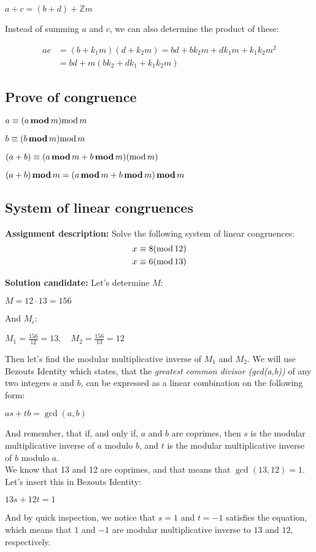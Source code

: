 \documentclass{report}
\newcommand{\cent}[1]{\begin{center}#1\end{center}}
\newcommand{\mAlign}[1]{\begin{align*}#1\end{align*}}
\newcommand{\doubleZ}{\mathbb{Z}}
\newcommand{\assignmentDescription}{\textbf{Assignment description: }}
\newcommand{\solution}{\textbf{Solution candidate: }}
\newcommand{\QED}{\boxed{}}
\newcommand{\modInline}{\text{mod\,}}
\newcommand{\modFunc}{\text{\,\textbf{mod}\,}}
\begin{document}
	\cent{$a+c=(b+d)+\doubleZ m$}
	
	Instead of summing $a$ and $c$, we can also determine the product of these:
	
	\mAlign{ac  &= (b + k_1m)(d + k_2m) = bd + b k_2m + d k_1 m + k_1 k_2 m^2\\
					   &= bd + m(bk_2 + dk_1 + k_1k_2m)}
	
	\QED
	
 	\subsection{Prove of congruence}
 	
 	\cent{$a \equiv (a \modFunc m) \modInline m$}
 	\cent{$b \equiv (b \modFunc m) \modInline m$}
 	\cent{$(a+b) \equiv (a \modFunc m + b \modFunc m) (\modInline m)$}
 	\cent{$(a+b) \modFunc m = (a \modFunc m + b \modFunc m) \modFunc m$}
 	\subsection{System of linear congruences}
 	\assignmentDescription
 	Solve the following system of linear congruences:
 	\mAlign{x &\equiv 8 (\modInline 12) \\
 				  x &\equiv 6 (\modInline 13)}
 	
 	\solution
 	Let's determine $M$:
 	
 	\cent{$M = 12 \cdot 13 = 156$}
 	
 	And $M_i$:
 	
 	\cent{$M_1 = \frac{156}{12} = 13, \quad M_2 = \frac{156}{13} = 12$}
 	
 	Then let's find the modular multiplicative inverse of $M_1$ and $M_2$. We will use Bezouts Identity which states, that the \textit{greatest common divisor (gcd(a,b))} of any two integers $a$ and $b$, can be expressed as a linear combination on the following form:
 	
 	\cent{$as+tb=\gcd(a,b)$}
 	
 	And remember, that if, and only if, $a$ and $b$ are coprimes, then $s$ is the modular multiplicative inverse of $a$ modulo $b$, and $t$ is the modular multiplicative inverse of $b$ modulo $a$.\\
 	
 	We know that 13 and 12 are coprimes, and that means that $\gcd(13,12) = 1$. Let's insert this in Bezouts Identity:
 	
 	\cent{$13s+12t=1$}
 	
 	And by quick inspection, we notice that $s=1$ and $t=-1$ satisfies the equation, which means that $1$ and $-1$ are modular multiplicative inverse to $13$ and $12$, respectively.\\
 	
\end{document}

